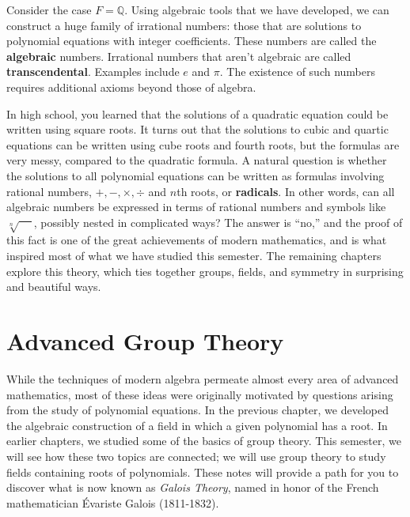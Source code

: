 Consider the case \(F = \mathbb{Q}\). Using algebraic tools that we have developed, we can construct a huge family of irrational numbers: those that are solutions to polynomial equations with integer coefficients. These numbers are called the \textbf{algebraic} numbers. Irrational numbers that aren't algebraic are called \textbf{transcendental}. Examples include \(e\) and \(\pi\). The existence of such numbers requires additional axioms beyond those of algebra.

In high school, you learned that the solutions of a quadratic equation could be written using square roots. It turns out that the solutions to cubic and quartic equations can be written using cube roots and fourth roots, but the formulas are very messy, compared to the quadratic formula. A natural question is whether the solutions to all polynomial equations can be written as formulas involving rational numbers, $+,-,\times,\div$ and $n$th roots, or \textbf{radicals}. In other words, can all algebraic numbers be expressed in terms of rational numbers and symbols like \(\sqrt[n]{\phantom{xx}}\), possibly nested in complicated ways? The answer is ``no,'' and the proof of this fact is one of the great achievements of modern mathematics, and is what inspired most of what we have studied this semester. The remaining chapters explore this theory, which ties together groups, fields, and symmetry in surprising and beautiful ways.
\begin{annotation}
\end{annotation}


\chapter{Advanced Group Theory}\label{chap:advancedgps}

While the techniques of modern algebra permeate almost every area of advanced mathematics, most of these ideas were originally motivated by questions arising from the study of polynomial equations. In the previous chapter, we developed the algebraic construction of a field in which a given polynomial has a root. In earlier chapters, we studied some of the basics of group theory. This semester, we will see how these two topics are connected; we will use group theory to study fields containing roots of polynomials. These notes will provide a path for you to discover what is now known as \textit{Galois Theory}, named in honor of the French mathematician \'{E}variste Galois (1811-1832).
\begin{annotation}
\end{annotation}

